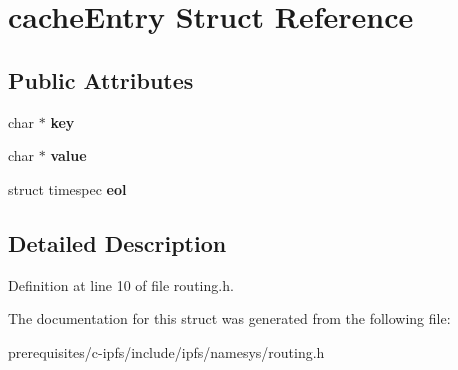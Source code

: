\hypertarget{structcache_entry}{}\section{cache\+Entry Struct Reference}
\label{structcache_entry}
\subsection*{Public Attributes}
\begin{DoxyCompactItemize}
\item 
\mbox{\label{structcache_entry_a55fe5ccc042d9d01cb7cf91ac554ff86}} 
char $\ast$ {\bfseries key}
\item 
\mbox{\label{structcache_entry_adf610f8d487a30f5b2b30405e686b62f}} 
char $\ast$ {\bfseries value}
\item 
\mbox{\label{structcache_entry_a1b51f484cda65f4870770555f37196d6}} 
struct timespec {\bfseries eol}
\end{DoxyCompactItemize}


\subsection{Detailed Description}


Definition at line 10 of file routing.\+h.



The documentation for this struct was generated from the following file\+:\begin{DoxyCompactItemize}
\item 
prerequisites/c-\/ipfs/include/ipfs/namesys/routing.\+h\end{DoxyCompactItemize}
